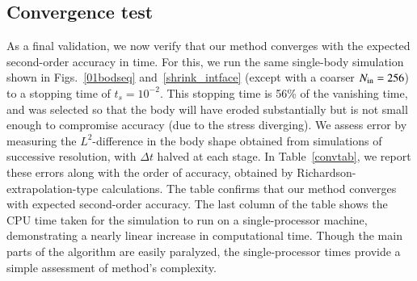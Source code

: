 \documentclass[preprint, 10pt]{elsarticle}
\begin{document}
\subsection{Convergence test}

As a final validation, we now verify that our method converges with the
expected second-order accuracy in time. For this, we run the same
single-body simulation shown in Figs.~\ref{01bodseq} and~\ref{shrink_intface} (except with a coarser $N_{\mathrm{in}}=256$) to a stopping time of $t_s = 10^{-2}$. This stopping time is 56\% of the vanishing time, and was selected so that the body will have eroded substantially but is not small enough to compromise accuracy (due to the stress diverging).
We assess error by measuring the $L^2$-difference in the body shape obtained from simulations of successive resolution, with $\Delta t$ halved at each stage. In Table~\ref{convtab}, we report these errors along with the order of accuracy, obtained by Richardson-extrapolation-type calculations. The table confirms that our method converges with expected second-order accuracy. The last column of the table shows the CPU time taken for the simulation to run on a single-processor machine, demonstrating a nearly linear increase in computational time. Though the main parts of the algorithm are easily paralyzed, the single-processor times provide a simple assessment of method's complexity.
\end{document}
